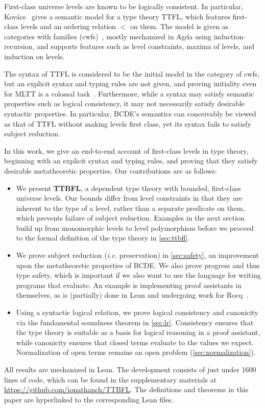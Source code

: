 \documentclass[a4paper,UKenglish,cleveref,autoref,thm-restate]{lipics-v2021}
\makeatletter
\newcommand{\citep}[1]{\cite{#1}}
\newcommand{\repo}{https://github.com/ionathanch/TTBFL}
\newcommand{\lang}{TTBFL\@\xspace}
\newcommand{\ie}{\textit{i.e.}\@\xspace}
\makeatother
\begin{document}
First-class universe levels are known to be logically consistent.
In particular, Kov\'{a}cs~\citep{gen-univ} gives a semantic model for a type theory TTFL,
which features first-class levels and an ordering relation $<$ on them.
The model is given as categories with families (cwfs)~\citep{cwf},
mostly mechanized in Agda using induction--recursion,
and supports features such as level constraints,
maxima of levels, and induction on levels.

The syntax of TTFL is considered to be the initial model in the category of cwfs,
but an explicit syntax and typing rules are not given,
and proving initiality even for MLTT is a colossal task~\citep{initiality}.
Furthermore, while a syntax may satisfy semantic properties such as logical consistency,
it may not necessarily satisfy desirable syntactic properties.
In particular, BCDE's semantics can conceivably be viewed as
that of TTFL without making levels first class,
yet its syntax fails to satisfy subject reduction.

In this work, we give an end-to-end account of first-class levels in type theory,
beginning with an explicit syntax and typing rules,
and proving that they satisfy desirable metatheoretic properties.
Our contributions are as follows:

\begin{itemize}[topsep=0pt]
  \item We present \textbf{\lang},
    a dependent type theory with bounded, first-class universe levels.
    Our bounds differ from level constraints in that
    they are inherent to the type of a level,
    rather than a separate predicate on them,
    which prevents failure of subject reduction.
    Examples in the next section build up from monomorphic levels to level polymorphism
    before we proceed to the formal definition of the type theory in \cref{sec:ttbfl}.
  \item We prove subject reduction (\ie preservation) in \cref{sec:safety},
    an improvement upon the metatheoretic properties of BCDE.
    We also prove progress and thus type safety,
    which is important if we also want to use the language for writing programs that evaluate.
    An example is implementing proof assistants in themselves,
    as is (partially) done in Lean and undergoing work for Rocq~\citep{coq-in-coq}.
  \item Using a syntactic logical relation,
    we prove logical consistency and canonicity
    via the fundamental soundness theorem in \cref{sec:lr}.
    Consistency ensures that the type theory is suitable
    as a basis for logical reasoning in a proof assistant,
    while canonicity ensures that closed terms evaluate to the values we expect.
    Normalization of open terms remains an open problem (\cref{sec:normalization}).
\end{itemize}
%
All results are mechanized in Lean.
The development consists of just under 1600 lines of code,
which can be found in the supplementary materials at \url{\repo}.
The definitions and theorems in this paper
are hyperlinked to the corresponding Lean files.
\end{document}
